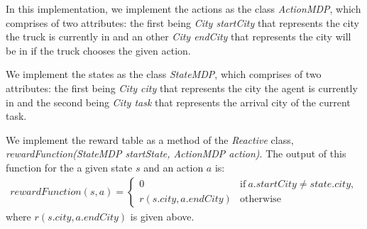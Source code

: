 \documentclass[11pt]{article}
\begin{document}
In this implementation, we implement the actions as the class \emph{ActionMDP}, which comprises of two attributes: the first being \emph{City startCity} that represents the city the truck is currently in and an other \emph{City endCity} that represents the city will be in if the truck chooses the given action.

We implement the states as the class \emph{StateMDP}, which comprises of two attributes: the first being \emph{City city} that represents the city the agent is currently in and the second being \emph{City task} that represents the arrival city of the current task.

We implement the reward table as a method of the \emph{Reactive} class, \emph{rewardFunction(StateMDP startState, ActionMDP action)}. The output of this function for the a given state $s$ and an action $a$ is: 
 	\begin{align*}
 		rewardFunction(s,a)= 
 			\begin{cases}
 				0 & \mathrm{if}\ a.startCity\neq state.city,\\
 				r(s.city,a.endCity) & \mathrm{otherwise}
			\end{cases}
	\end{align*}
where $r(s.city,a.endCity)$  is given above.
 
\end{document}
